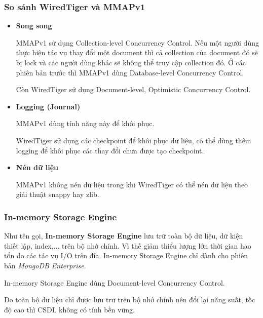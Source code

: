 \subsubsection{So sánh WiredTiger và MMAPv1}
\begin{itemize}
\item \textbf{Song song}

MMAPv1 sử dụng Collection-level Concurrency Control. Nếu một người dùng thực hiện tác vụ thay đổi một document thì cả collection của document đó sẽ bị lock và các người dùng khác sẽ không thể truy cập collection đó. Ở các phiên bản trước thì MMAPv1 dùng Database-level Concurrency Control.

Còn WiredTiger sử dụng Document-level, Optimistic Concurrency Control.
\item \textbf{Logging (Journal)}

MMAPv1 dùng tính năng này để khôi phục.

WiredTiger sử dụng các checkpoint để khôi phục dữ liệu, có thể dùng thêm logging để khôi phục các thay đổi chưa được tạo checkpoint.
\item \textbf{Nén dữ liệu}

MMAPv1 không nén dữ liệu trong khi WiredTiger có thể nén dữ liệu theo giải thuật snappy hay zlib.
\end{itemize}
\subsubsection{In-memory Storage Engine}
Như tên gọi, \textbf{In-memory Storage Engine} lưu trữ toàn bộ dữ liệu, dữ kiện thiết lập, index,... trên bộ nhớ chính. Vì thế giảm thiểu lượng lớn thời gian hao tổn do các tác vụ I/O trên đĩa. In-memory Storage Engine chỉ dành cho phiên bản \textit{MongoDB Enterprise}.

In-memory Storage Engine dùng Document-level Concurrency Control.

Do toàn bộ dữ liệu chỉ được lưu trữ trên bộ nhớ chính nên đổi lại năng suất, tốc độ cao thì CSDL không có tính bền vững.